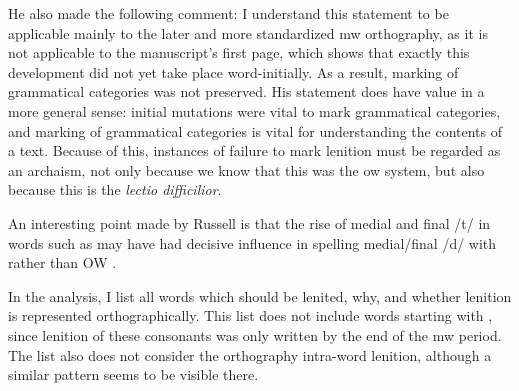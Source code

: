 He also made the following comment:  I understand this statement to be applicable mainly to the later and more standardized \gls{mw} orthography, as it is not applicable to the manuscript's first page, which shows that exactly this development did not yet take place word-initially. As a result, marking of grammatical categories was not preserved. His statement does have value in a more general sense: initial mutations were vital to mark grammatical categories, and marking of grammatical categories is vital for understanding the contents of a text. Because of this, instances of failure to mark lenition must be regarded as an archaism, not only because we know that this was the \gls{ow} system, but also because this is the \textit{lectio difficilior}.

An interesting point made by Russell is that the rise of medial and final /t/ in words such as  may have had decisive influence in spelling medial/final /d/ with  rather than OW .
 
 In the analysis, I list all words which should be lenited, why, and whether lenition is represented orthographically. This list does not include words starting with , since lenition of these consonants was only written by the end of the \gls{mw} period. The list also does not consider the orthography intra-word lenition, although a similar pattern seems to be visible there. 

